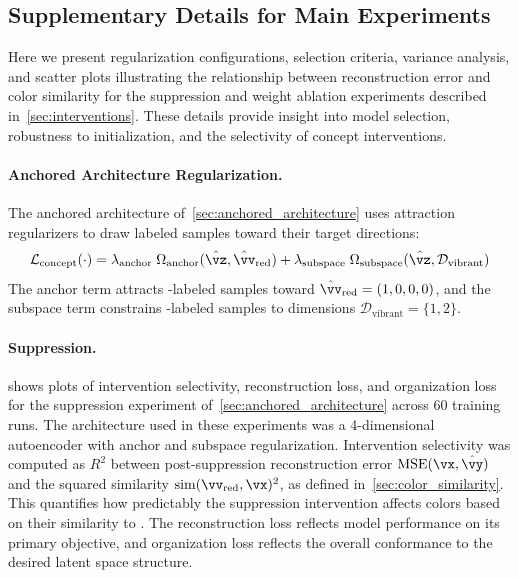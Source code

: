 \subsection{Supplementary Details for Main Experiments}
\label{sec:additional_results}

Here we present regularization configurations, selection criteria, variance analysis, and scatter plots illustrating the relationship between reconstruction error and color similarity for the suppression and weight ablation experiments described in~\cref{sec:interventions}. These details provide insight into model selection, robustness to initialization, and the selectivity of concept interventions.

\paragraph{Anchored Architecture Regularization.}
The anchored architecture of~\cref{sec:anchored_architecture} uses attraction regularizers to draw labeled samples toward their target directions:
%
\begin{equation}
    \mathcal{L}_{\text{concept}}(\cdot) = \lambda_{\text{anchor}} \; \Omega_{\text{anchor}}(\hat{\vz},\hat{\vv}_\text{red}) + \lambda_{\text{subspace}} \; \Omega_{\text{subspace}}(\hat{\vz},\mathcal{D}_\text{vibrant})
\end{equation}
%
The anchor term attracts -labeled samples toward $\hat{\vv}_\text{red} = (1,0,0,0)$, and the subspace term constrains -labeled samples to dimensions $\mathcal{D}_\text{vibrant} = \{1,2\}$.

\paragraph{Suppression.}
 shows plots of intervention selectivity, reconstruction loss, and organization loss for the suppression experiment of~\cref{sec:anchored_architecture} across 60 training runs. The architecture used in these experiments was a 4-dimensional autoencoder with anchor and subspace regularization. Intervention selectivity was computed as $R^2$ between post-suppression reconstruction error $\text{MSE}(\vx,\hat{\vy})$ and the squared similarity $\text{sim}(\vv_{\text{red}}, \vx)^2$, as defined in~\cref{sec:color_similarity}. This quantifies how predictably the suppression intervention affects colors based on their similarity to . The reconstruction loss reflects model performance on its primary objective, and organization loss reflects the overall conformance to the desired latent space structure.

